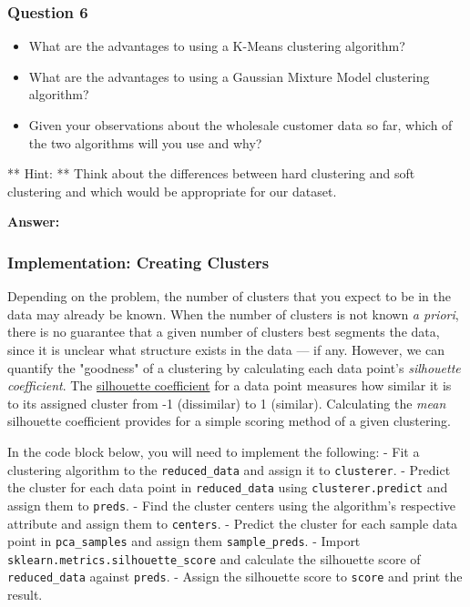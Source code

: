 \documentclass[11pt]{article}
\providecommand{\tightlist}{%
      \setlength{\itemsep}{0pt}\setlength{\parskip}{0pt}}
\begin{document}
    \subsubsection{Question 6}\label{question-6}

\begin{itemize}
\tightlist
\item
  What are the advantages to using a K-Means clustering algorithm?
\item
  What are the advantages to using a Gaussian Mixture Model clustering
  algorithm?
\item
  Given your observations about the wholesale customer data so far,
  which of the two algorithms will you use and why?
\end{itemize}

** Hint: ** Think about the differences between hard clustering and soft
clustering and which would be appropriate for our dataset.

    \textbf{Answer:}

    \subsubsection{Implementation: Creating
Clusters}\label{implementation-creating-clusters}

Depending on the problem, the number of clusters that you expect to be
in the data may already be known. When the number of clusters is not
known \emph{a priori}, there is no guarantee that a given number of
clusters best segments the data, since it is unclear what structure
exists in the data --- if any. However, we can quantify the "goodness"
of a clustering by calculating each data point's \emph{silhouette
coefficient}. The
\href{http://scikit-learn.org/stable/modules/generated/sklearn.metrics.silhouette_score.html}{silhouette
coefficient} for a data point measures how similar it is to its assigned
cluster from -1 (dissimilar) to 1 (similar). Calculating the \emph{mean}
silhouette coefficient provides for a simple scoring method of a given
clustering.

In the code block below, you will need to implement the following: - Fit
a clustering algorithm to the \texttt{reduced\_data} and assign it to
\texttt{clusterer}. - Predict the cluster for each data point in
\texttt{reduced\_data} using \texttt{clusterer.predict} and assign them
to \texttt{preds}. - Find the cluster centers using the algorithm's
respective attribute and assign them to \texttt{centers}. - Predict the
cluster for each sample data point in \texttt{pca\_samples} and assign
them \texttt{sample\_preds}. - Import
\texttt{sklearn.metrics.silhouette\_score} and calculate the silhouette
score of \texttt{reduced\_data} against \texttt{preds}. - Assign the
silhouette score to \texttt{score} and print the result.
\end{document}
